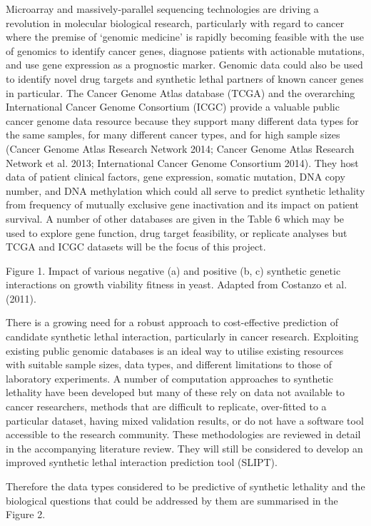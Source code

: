 Microarray and massively-parallel sequencing technologies are driving a revolution in molecular biological research, particularly with regard to cancer where the premise of ‘genomic medicine’ is rapidly becoming feasible with the use of genomics to identify cancer genes, diagnose patients with actionable mutations, and use gene expression as a prognostic marker.  Genomic data could also be used to identify novel drug targets and synthetic lethal partners of known cancer genes in particular.  The Cancer Genome Atlas database (TCGA) and the overarching International Cancer Genome Consortium (ICGC) provide a valuable public cancer genome data resource because they support many different data types for the same samples, for many different cancer types, and for high sample sizes (Cancer Genome Atlas Research Network 2014; Cancer Genome Atlas Research Network et al. 2013; International Cancer Genome Consortium 2014).  They host data of patient clinical factors, gene expression, somatic mutation, DNA copy number, and DNA methylation which could all serve to predict synthetic lethality from frequency of mutually exclusive gene inactivation and its impact on patient survival.  A number of other databases are given in the Table 6 which may be used to explore gene function, drug target feasibility, or replicate analyses but TCGA and ICGC datasets will be the focus of this project.

Figure 1.  Impact of various negative (a) and positive (b, c) synthetic genetic interactions on growth viability fitness in yeast.  Adapted from Costanzo et al. (2011).   

There is a growing need for a robust approach to cost-effective prediction of candidate synthetic lethal interaction, particularly in cancer research.  Exploiting existing public genomic databases is an ideal way to utilise existing resources with suitable sample sizes, data types, and different limitations to those of laboratory experiments.  A number of computation approaches to synthetic lethality have been developed but many of these rely on data not available to cancer researchers, methods that are difficult to replicate, over-fitted to a particular dataset, having mixed validation results, or do not have a software tool accessible to the research community.  These methodologies are reviewed in detail in the accompanying literature review.  They will still be considered to develop an improved synthetic lethal interaction prediction tool (SLIPT).  

Therefore the data types considered to be predictive of synthetic lethality and the biological questions that could be addressed by them are summarised in the Figure 2.  
 
